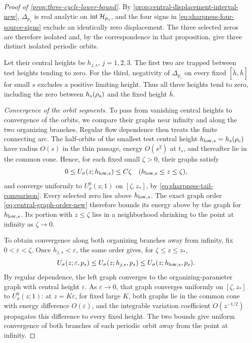 \begin{proof}[Proof of \cref{prop:three-cycle-lower-bound}]
By \cref{prop:central-displacement-interval-new},
\(\Delta_{p_s}\) is real analytic on
\(\operatorname{int}\mathcal H_{p_s}\), and the four signs in
\eqref{eq:sharpness-four-source-signs} exclude an identically zero
displacement. The three selected zeros are therefore isolated and,
by the correspondence in that proposition, give three distinct
isolated periodic orbits.

Let their central heights be \(h_{j,s}\), \(j=1,2,3\).
The first two are trapped between test heights tending to zero.
For the third, negativity of \(\Delta_{p_s}\) on every fixed
\([\widetilde h,\bar h]\) for small \(s\) excludes a positive
limiting height. Thus all three heights tend to zero, including the
zero between \(h_s(\rho_{\rm a})\) and the fixed height \(\bar h\).

\emph{Convergence of the orbit segments.}
To pass from vanishing central heights to convergence of the orbits,
we compare their graphs near infinity and along the two organizing
branches. Regular flow dependence then treats the finite connecting
arc.
The half-orbits of the smallest test central height
\(h_{{\rm low},s}=h_s(\rho_{\rm c})\) have radius \(O(s)\) in the
thin passage, energy \(O(s^2)\) at \(t_s\), and thereafter lie in
the common cone. Hence, for each fixed small \(\zeta>0\), their
graphs satisfy
\[
 0\le U_\sigma(z;h_{{\rm low},s})\le C\zeta
       \quad(h_{{\rm low},s}\le z\le\zeta),
\]
and converge uniformly to \(U_\sigma^0(z;1)\) on
\([\zeta,z_*]\), by \eqref{eq:sharpness-tail-comparison}.
Every selected zero lies above \(h_{{\rm low},s}\). The exact graph
order \eqref{eq:central-graph-order-new} therefore bounds its energy
above by the graph for \(h_{{\rm low},s}\). Its portion with
\(z\le\zeta\) lies in a neighborhood shrinking to the point at
infinity as \(\zeta\to0\).

To obtain convergence along both organizing branches away from
infinity, fix \(0<\varepsilon<\zeta\). Once
\(h_{j,s}<\varepsilon\), the same order gives, for
\(\zeta\le z\le z_*\),
\[
 U_\sigma(z;\varepsilon,p_s)
 \le U_\sigma(z;h_{j,s},p_s)
 \le U_\sigma(z;h_{{\rm low},s},p_s).
\]
By regular dependence, the left graph converges to the
organizing-parameter graph with central height \(\varepsilon\).
As \(\varepsilon\to0\), that graph converges uniformly on
\([\zeta,z_*]\) to \(U_\sigma^0(z;1)\): at
\(z=K\varepsilon\), for fixed large \(K\), both graphs lie in the
common cone with energy difference \(O(\varepsilon)\), and the
integrable variation coefficient \(O(z^{-1/2})\) propagates this
difference to every fixed height. The two bounds give uniform
convergence of both branches of each periodic orbit away from the
point at infinity.


\end{proof}
